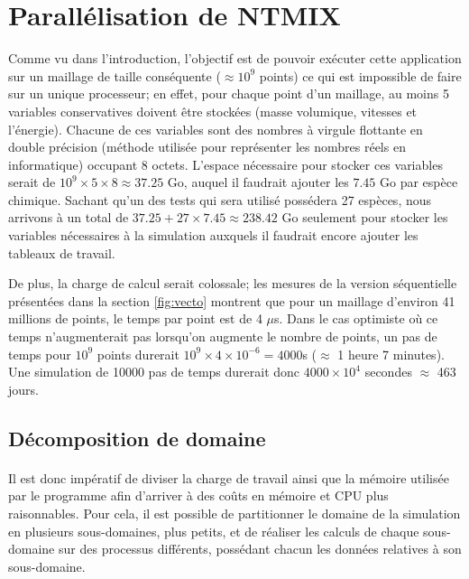 \section{Parallélisation de NTMIX} \label{sec:part2}


Comme vu dans l'introduction, l'objectif est de pouvoir exécuter cette application sur un maillage de taille conséquente ($\approx 10^9$ points) ce qui est impossible de faire sur un unique processeur; en effet, pour chaque point d'un maillage, au moins 5 variables conservatives doivent être stockées (masse volumique, vitesses et l'énergie). Chacune de ces variables sont des nombres à virgule flottante en double précision (méthode utilisée pour représenter les nombres réels en informatique) occupant 8 octets. L'espace nécessaire pour stocker ces variables serait de $10^9 \times 5 \times 8 \approx 37.25$ Go, auquel il faudrait ajouter les $7.45$ Go par espèce chimique. Sachant qu'un des tests qui sera utilisé possédera 27 espèces, nous arrivons à un total de $37.25+27 \times 7.45\approx 238.42$ Go seulement pour stocker les variables nécessaires à la simulation auxquels il faudrait encore ajouter les tableaux de travail.

De plus, la charge de calcul serait colossale; les mesures de la version séquentielle présentées dans la section \ref{fig:vecto} montrent que pour un maillage d'environ 41 millions de points, le temps par point est de 4 $\mu$s. Dans le cas optimiste où ce temps n'augmenterait pas lorsqu'on augmente le nombre de points, un pas de temps pour $10^9$ points durerait $10^9\times4\times10^{-6}=4000$s ($\approx$ 1 heure 7 minutes). Une simulation de 10000 pas de temps durerait donc $4000\times10^4$ secondes $\approx$ 463 jours.


\subsection{Décomposition de domaine}
\paragraph{}Il est donc impératif de diviser la charge de travail ainsi que la mémoire utilisée par le programme afin d'arriver à des coûts en mémoire et CPU plus raisonnables. Pour cela, il est possible de partitionner le domaine de la simulation en plusieurs sous-domaines, plus petits, et de réaliser les calculs de chaque sous-domaine sur des processus différents, possédant chacun les données relatives à son sous-domaine. 

